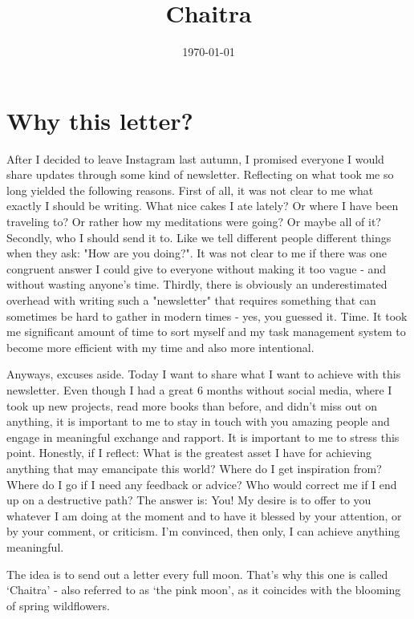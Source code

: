 \documentclass[12pt]{article}
\title{Chaitra}
\date{\today}
\begin{document}
\maketitle

\section*{Why this letter?}

After I decided to leave Instagram last autumn, I promised everyone I would share updates through some kind of newsletter.
Reflecting on what took me so long yielded the following reasons. First of all, it was not clear to me what exactly I should be writing. What nice cakes I ate lately? Or where I have been traveling to? Or rather how my meditations were going? Or maybe all of it? Secondly, who I should send it to. Like we tell different people different things when they ask: "How are you doing?". It was not clear to me if there was one congruent answer I could give to everyone without making it too vague - and without wasting anyone's time. Thirdly, there is obviously an underestimated overhead with writing such a "newsletter" that requires something that can sometimes be hard to gather in modern times - yes, you guessed it. Time. It took me significant amount of time to sort myself and my task management system to become more efficient with my time and also more intentional.

Anyways, excuses aside. Today I want to share what I want to achieve with this newsletter. Even though I had a great 6 months without social media, where I took up new projects, read more books than before, and didn't miss out on anything, it is important to me to stay in touch with you amazing people and engage in meaningful exchange and rapport. It is important to me to stress this point. Honestly, if I reflect: What is the greatest asset I have for achieving anything that may emancipate this world? Where do I get inspiration from? Where do I go if I need any feedback or advice? Who would correct me if I end up on a destructive path? The answer is: You! My desire is to offer to you whatever I am doing at the moment and to have it blessed by your attention, or by your comment, or criticism. I'm convinced, then only, I can achieve anything meaningful.

The idea is to send out a letter every full moon. That’s why this one is called ‘Chaitra’ - also referred to as ‘the pink moon’, as it coincides with the blooming of spring wildflowers.
\end{document}
